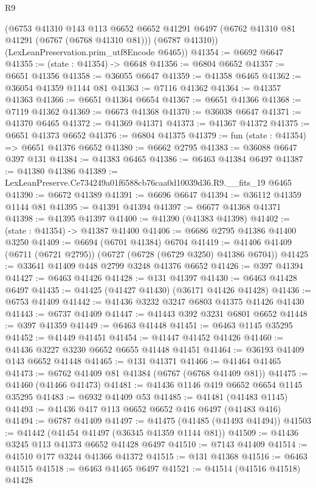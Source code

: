 \begin{lexlean}{R9}
\begin{coremodule}
      (@6753
        @41310
        @143
        @113
        @6652
        @6652
        @41291
        @6497
        (@6762 @41310 @81 @41291 (@6767 (@6768 @41310 @81)))
        (@6787 @41310))
      (LexLeanPreservation.prim_utf8Encode @6465))
@41354 := @6692 @6647
@41355 := (state : @41354) -> @6648
@41356 := @6804 @6652
@41357 := @6651 @41356
@41358 := @36055 @6647
@41359 := @41358 @6465
@41362 := @36054 @41359 @1144 @81
@41363 := @7116 @41362
@41364 := @41357 @41363
@41366 := @6651 @41364 @6654
@41367 := @6651 @41366
@41368 := @7119 @41362
@41369 := @6673 @41368
@41370 := @36038 @6647
@41371 := @41370 @6465
@41372 := @41369 @41371
@41373 := @41367 @41372
@41375 := @6651 @41373 @6652
@41376 := @6804 @41375
@41379 := fun (state : @41354) => @6651 @41376 @6652
@41380 := @6662 @2795
@41383 := @36088 @6647 @397 @131
@41384 := @41383 @6465
@41386 := @6463 @41384 @6497
@41387 := @41380 @41386
@41389 := LexLeanPreserve.Ce734249a01f6588cb76caa0d10039d36.R9.__fits_19 @6465
@41390 := @6672 @41389
@41391 := @6696 @6647
@41394 := @36112 @41359 @1144 @81
@41395 := @41391 @41394
@41397 := @6677 @41368 @41371
@41398 := @41395 @41397
@41400 := @41390 (@41383 @41398)
@41402 := (state : @41354) -> @41387 @41400
@41406 := @6686 @2795 @41386 @41400 @3250
@41409 := @6694 (@6701 @41384) @6704
@41419 := @41406 @41409 (@6711 (@6721 @2795)) (@6727 (@6728 (@6729 @3250) @41386 @6704))
@41425 := @33641 @41409 @448 @2799 @3248 @41376 @6652
@41426 := @397 @41394
@41427 := @6463 @41426
@41428 := @131 @41397
@41430 := @6463 @41428 @6497
@41435 := @41425 (@41427 @41430) (@36171 @41426 @41428)
@41436 := @6753 @41409
@41442 := @41436 @3232 @3247 @6803 @41375 @41426 @41430
@41443 := @6737 @41409
@41447 := @41443 @392 @3231 @6801 @6652
@41448 := @397 @41359
@41449 := @6463 @41448
@41451 := @6463 @1145 @35295
@41452 := @41449 @41451
@41454 := @41447 @41452 @41426
@41460 := @41436 @3227 @3230 @6652 @6655 @41448 @41451
@41464 := @36193 @41409 @143 @6652 @41448
@41465 := @131 @41371
@41466 := @41464 @41465
@41473 := @6762 @41409 @81 @41384 (@6767 (@6768 @41409 @81))
@41475 := @41460 (@41466 @41473)
@41481 := @41436 @1146 @419 @6652 @6654 @1145 @35295
@41483 := @6932 @41409 @53
@41485 := @41481 (@41483 @1145)
@41493 := @41436 @417 @113 @6652 @6652 @416 @6497 (@41483 @416)
@41494 := @6787 @41409
@41497 := @41475 (@41485 (@41493 @41494))
@41503 := @41442 (@41454 @41497 (@36345 @41359 @1144 @81))
@41509 := @41436 @3245 @113 @41373 @6652 @41428 @6497
@41510 := @7143 @41409
@41514 := @41510 @177 @3244 @41366 @41372
@41515 := @131 @41368
@41516 := @6463 @41515
@41518 := @6463 @41465 @6497
@41521 := @41514 (@41516 @41518) @41428

\end{coremodule}
\end{lexlean}
